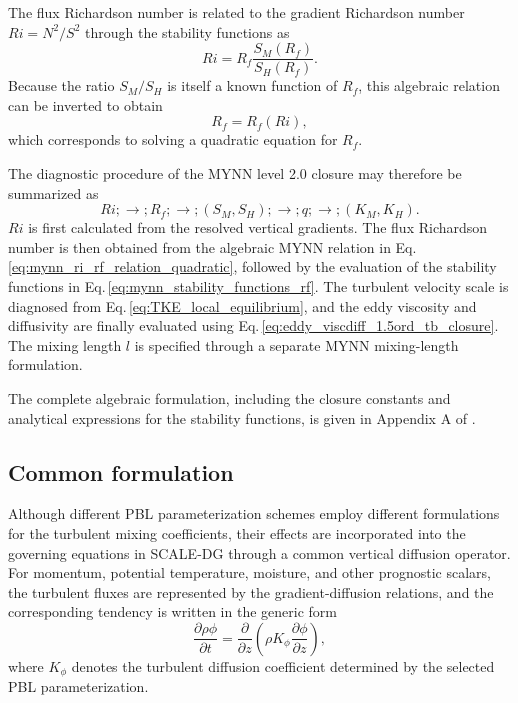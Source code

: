 The flux Richardson number is related to the gradient Richardson number $Ri=N^2/S^2$ through the stability functions as
%
\begin{equation}
Ri = R_f\frac{S_M(R_f)}{S_H(R_f)}.
\label{eq:mynn_ri_rf_relation}
\end{equation}
%
Because the ratio $S_M/S_H$ is itself a known function of $R_f$, this algebraic relation can be inverted to obtain
%
\begin{equation}
R_f=R_f(Ri), 
\label{eq:mynn_ri_rf_relation_quadratic}
\end{equation}
%
which corresponds to solving a quadratic equation for $R_f$.


The diagnostic procedure of the MYNN level 2.0 closure may therefore be summarized as
%
\begin{equation}
Ri
;\longrightarrow;
R_f
;\longrightarrow;
\left(S_M,S_H\right)
;\longrightarrow;
q
;\longrightarrow;
\left(K_M,K_H\right).
\label{eq:mynn_l2_diagnostic_sequence}
\end{equation}
%
$Ri$ is first calculated from the resolved vertical gradients.
The flux Richardson number is then obtained from the algebraic MYNN relation in Eq.\,\eqref{eq:mynn_ri_rf_relation_quadratic},
followed by the evaluation of the stability functions in Eq.\,\eqref{eq:mynn_stability_functions_rf}.
The turbulent velocity scale is diagnosed from Eq.\,\eqref{eq:TKE_local_equilibrium}, 
and the eddy viscosity and diffusivity are finally evaluated using Eq.\,\eqref{eq:eddy_viscdiff_1.5ord_tb_closure}.
The mixing length $l$ is specified through a separate MYNN mixing-length formulation.

The complete algebraic formulation, including the closure constants and analytical expressions for the stability functions,
is given in Appendix A of \cite{Nakanishi2006}.


\subsection{Common formulation}
Although different PBL parameterization schemes employ different formulations for the turbulent mixing coefficients, 
their effects are incorporated into the governing equations in SCALE-DG through a common vertical diffusion operator.
For momentum, potential temperature, moisture, and other prognostic scalars, the turbulent fluxes are represented by the gradient-diffusion relations,
and the corresponding tendency is written in the generic form
%
\begin{equation}
\frac{\partial \rho\phi}{\partial t} = \frac{\partial}{\partial z}\left(\rho K_\phi \frac{\partial \phi}{\partial z}\right),
\end{equation}
%
where $K_\phi$ denotes the turbulent diffusion coefficient determined by the selected PBL parameterization.

